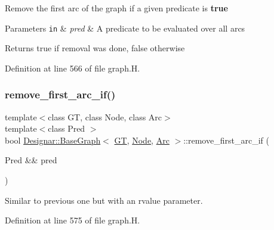 Remove the first arc of the graph if a given predicate is {\bfseries true} 


\begin{DoxyParams}[1]{Parameters}
\mbox{\tt in}  & {\em pred} & A predicate to be evaluated over all arcs \\
\hline
\end{DoxyParams}
\begin{DoxyReturn}{Returns}
{\ttfamily true} if removal was done, {\ttfamily false} otherwise 
\end{DoxyReturn}


Definition at line 566 of file graph.\+H.

\mbox{\label{class_designar_1_1_base_graph_a990426c9e87f922bbbd0c9bc4d2cedd8}} 
\subsubsection{\texorpdfstring{remove\+\_\+first\+\_\+arc\+\_\+if()}{remove\_first\_arc\_if()}\hspace{0.1cm}{\footnotesize\ttfamily [2/2]}}
{\footnotesize\ttfamily template$<$class GT, class Node, class Arc$>$ \\
template$<$class Pred $>$ \\
bool \hyperlink{class_designar_1_1_base_graph}{Designar\+::\+Base\+Graph}$<$ \hyperlink{demo-buildgraph_8_c_a3001c40d2c31ca87ed96cd7d1334a55e}{GT}, \hyperlink{namespace_designar_a5af326c65aa2bd26b26c410f2030d09e}{Node}, \hyperlink{namespace_designar_a3f55fb5513d62ff47cbc8f72b8e95d6f}{Arc} $>$\+::remove\+\_\+first\+\_\+arc\+\_\+if (\begin{DoxyParamCaption}\item[{Pred \&\&}]{pred }\end{DoxyParamCaption})\hspace{0.3cm}{\ttfamily [inline]}}



Similar to previous one but with an rvalue parameter. 



Definition at line 575 of file graph.\+H.

\mbox{\label{class_designar_1_1_base_graph_a1311af417ba4d373d7051b73cc2696ec}} 
